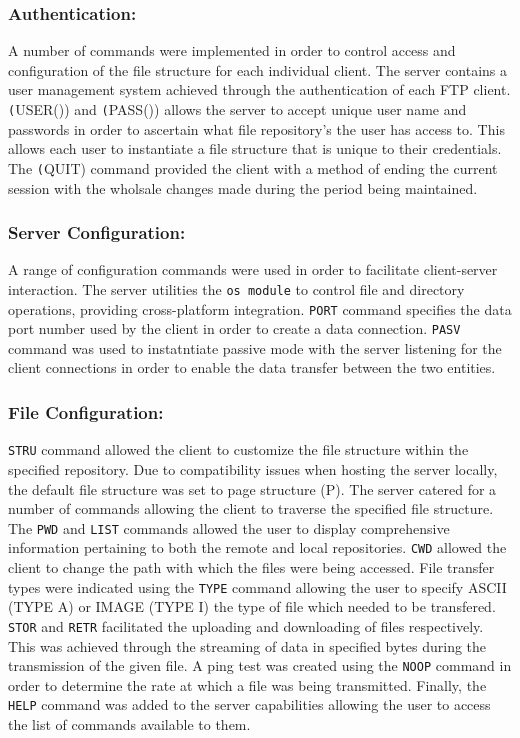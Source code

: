 \documentclass[10pt,twocolumn]{witseiepaper}
\begin{document}
\subsubsection*{Authentication:}
A number of commands were implemented in order to control access and configuration of the file structure for each individual client. The server contains a user management system achieved through the authentication of each FTP client. \texttt(USER()) and \texttt(PASS()) allows the server to accept unique user name and passwords in order to ascertain what file repository's the user has access to. This allows each user to instantiate a file structure that is unique to their credentials. The \texttt(QUIT) command provided the client with a method of ending the current session with the wholsale changes made during the period being maintained.

\subsubsection*{Server Configuration:}

A range of configuration commands were used in order to facilitate client-server interaction. The server utilities the \texttt{os module} to control file and directory operations, providing cross-platform integration. \texttt{PORT} command specifies the data port number used by the client in order to create a data connection. \texttt{PASV} command was used to instatntiate passive mode with the server listening for the client connections in order to enable the data transfer between the two entities.

\subsubsection*{File Configuration:}

\texttt{STRU} command allowed the client to customize the file structure within the specified repository. Due to compatibility issues when hosting the server locally, the default file structure was set to page structure (P). The server catered for a number of commands allowing the client to traverse the specified file structure. The \texttt{PWD} and \texttt{LIST} commands allowed the user to display comprehensive information pertaining to both the remote and local repositories. \texttt{CWD} allowed the client to change the path with which the files were being accessed. File transfer types were indicated using the \texttt{TYPE} command allowing the user to specify ASCII (TYPE A) or IMAGE (TYPE I) the type of file which needed to be transfered. \texttt{STOR} and \texttt{RETR} facilitated the uploading and downloading of files respectively. This was achieved through the streaming of data in specified bytes during the transmission of the given file. A ping test was created using the \texttt{NOOP} command in order to determine the rate at which a file was being transmitted. Finally, the \texttt{HELP} command was added to the server capabilities allowing the user to access the list of commands available to them.
\end{document}
